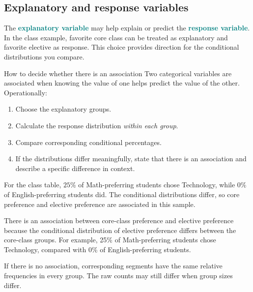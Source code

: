 \documentclass[11pt]{article}
\newcommand{\term}[1]{\textbf{\textcolor{Teal}{#1}}}
\newcommand{\ans}[1]{\textcolor{AnswerBlue}{#1}}
\begin{document}
\subsection{Explanatory and response variables}
The \term{explanatory variable} may help explain or predict the \term{response variable}. In the class example, favorite core class can be treated as explanatory and favorite elective as response. This choice provides direction for the conditional distributions you compare.

\begin{bigidea}{How to decide whether there is an association}
Two categorical variables are associated when knowing the value of one helps predict the value of the other. Operationally:
\begin{enumerate}[label=\arabic*.]
  \item Choose the explanatory groups.
  \item Calculate the response distribution \emph{within each group}.
  \item Compare corresponding conditional percentages.
  \item If the distributions differ meaningfully, state that there is an association and describe a specific difference in context.
\end{enumerate}
\end{bigidea}

For the class table, $25\%$ of Math-preferring students chose Technology, while $0\%$ of English-preferring students did. The conditional distributions differ, so core preference and elective preference are associated in this sample.

\begin{answerbox}
There \ans{is} an association between \ans{core-class preference} and \ans{elective preference} because the conditional distribution of \ans{elective preference} differs between the core-class groups. For example, \ans{25\% of Math-preferring students chose Technology, compared with 0\% of English-preferring students}.
\end{answerbox}

\begin{trapbox}[No association]
If there is no association, corresponding segments have the same relative frequencies in every group. The raw counts may still differ when group sizes differ.
\end{trapbox}
\end{document}
